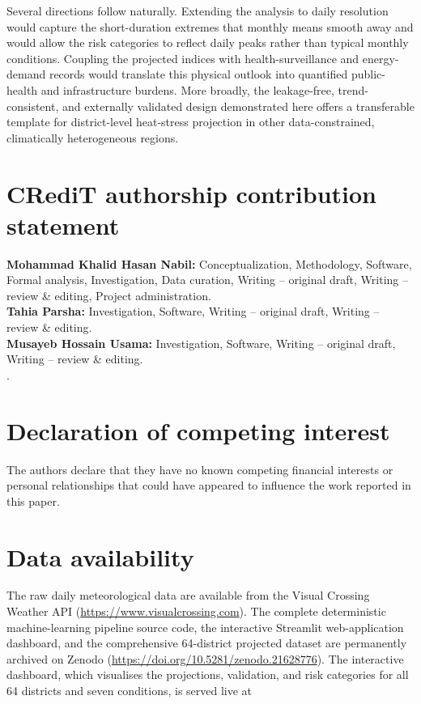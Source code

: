 \documentclass[review,11pt]{elsarticle}
\begin{document}
Several directions follow naturally. Extending the analysis to daily resolution
would capture the short-duration extremes that monthly means smooth away and would
allow the risk categories to reflect daily peaks rather than typical monthly
conditions. Coupling the projected indices with health-surveillance and
energy-demand records would translate this physical outlook into quantified
public-health and infrastructure burdens. More broadly, the leakage-free,
trend-consistent, and externally validated design demonstrated here offers a
transferable template for district-level heat-stress projection in other
data-constrained, climatically heterogeneous regions.

\section*{CRediT authorship contribution statement}
\noindent\textbf{Mohammad Khalid Hasan Nabil:} Conceptualization, Methodology, Software, Formal analysis, Investigation, Data curation, Writing -- original
draft, Writing -- review \& editing, Project administration.\\[2pt]
\textbf{Tahia Parsha:} Investigation, Software, Writing -- original draft, Writing -- review \& editing.\\[2pt]
\textbf{Musayeb Hossain Usama:} Investigation, Software, Writing -- original draft, Writing -- review \& editing.\\[2pt]. 

\section*{Declaration of competing interest}
The authors declare that they have no known competing financial interests or
personal relationships that could have appeared to influence the work reported in
this paper.

\section*{Data availability}
The raw daily meteorological data are available from the Visual Crossing Weather
API (\url{https://www.visualcrossing.com}). The complete deterministic
machine-learning pipeline source code, the interactive Streamlit web-application
dashboard, and the comprehensive 64-district projected dataset are permanently
archived on Zenodo (\url{https://doi.org/10.5281/zenodo.21628776}). The
interactive dashboard, which visualises the projections, validation, and risk
categories for all 64 districts and seven conditions, is served live at 
\end{document}
